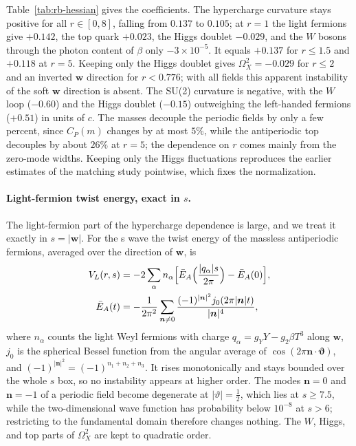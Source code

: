 Table~\ref{tab:rb-hessian} gives the coefficients.
The hypercharge curvature stays positive for all $r\in[0,8]$, falling from $0.137$ to $0.105$; at $r=1$ the light fermions give $+0.142$, the top quark $+0.023$, the Higgs doublet $-0.029$, and the $W$ bosons through the photon content of $\beta$ only $-3\times10^{-5}$. %
It equals $+0.137$ for $r\le1.5$ and $+0.118$ at $r=5$. %
Keeping only the Higgs doublet gives $\Omega_X^2=-0.029$ for $r\le2$ and an inverted $\bm w$ direction for $r<0.776$; with all fields this apparent instability of the soft $\bm w$ direction is absent. %
The SU(2) curvature is negative, with the $W$ loop ($-0.60$) and the Higgs doublet ($-0.15$) outweighing the left-handed fermions ($+0.51$) in units of $c$. %
The masses decouple the periodic fields by only a few percent, since $C_P(m)$ changes by at most $5\%$, while the antiperiodic top decouples by about $26\%$ at $r=5$; the dependence on $r$ comes mainly from the zero-mode widths. %
Keeping only the Higgs fluctuations reproduces the earlier estimates of the matching study pointwise, which fixes the normalization. %

\paragraph{Light-fermion twist energy, exact in $s$.}
The light-fermion part of the hypercharge dependence is large, and we treat it exactly in $s=|\bm w|$.
For the s wave the twist energy of the massless antiperiodic fermions, averaged over the direction of $\bm w$, is
\begin{align}
V_L(r,s)&=-2\sum_\alpha n_\alpha\Bigl[\bar E_A\Bigl(\frac{|q_\alpha|s}{2\pi}\Bigr)-\bar E_A(0)\Bigr],\nonumber\\
\bar E_A(t)&=-\frac{1}{2\pi^2}\sum_{\bm n\neq0}\frac{(-1)^{|\bm n|^2}j_0(2\pi|\bm n|t)}{|\bm n|^4},
\label{eq:rb-VL}
\end{align}
where $n_\alpha$ counts the light Weyl fermions with charge $q_\alpha=g_YY-g_2\beta T^3$ along $\bm w$, $j_0$ is the spherical Bessel function from the angular average of $\cos(2\pi\bm n\cdot\bm\vartheta)$, and $(-1)^{|\bm n|^2}=(-1)^{n_1+n_2+n_3}$.
It rises monotonically and stays bounded over the whole $s$ box, so no instability appears at higher order.
The modes $\bm n=0$ and $\bm n=-1$ of a periodic field become degenerate at $|\vartheta|=\frac12$, which lies at $s\ge7.5$, while the two-dimensional wave function has probability below $10^{-8}$ at $s>6$; restricting to the fundamental domain therefore changes nothing. %
The $W$, Higgs, and top parts of $\Omega_X^2$ are kept to quadratic order.

